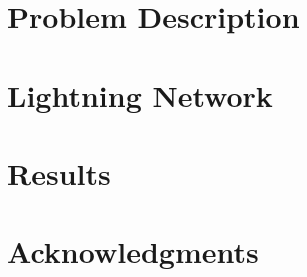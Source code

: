 \section{Problem Description}
    \label{sec:problem}
    

\clearpage

   
   
\clearpage
    
\clearpage

    \label{sec:scaling}
    
\clearpage
\section{Lightning Network}
    \label{sec:lightning:network}
    
\clearpage
    \label{sec:evaluation}
	
\clearpage
\section{Results}
\clearpage
    \label{sec:discussion}
    
\clearpage
\section{Acknowledgments}
    \label{sec:acknowledgments}
